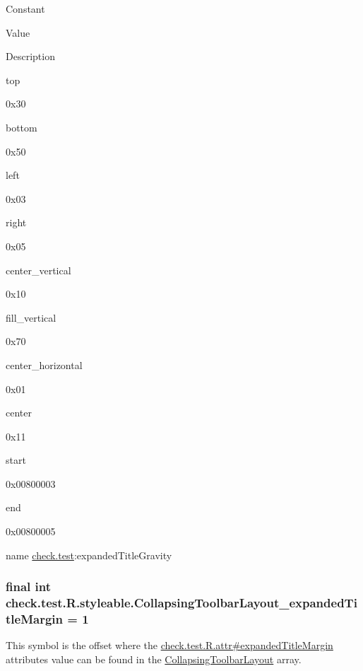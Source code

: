 Constant

Value

Description 

{\ttfamily top}

0x30

{\ttfamily bottom}

0x50

{\ttfamily left}

0x03

{\ttfamily right}

0x05

{\ttfamily center\+\_\+vertical}

0x10

{\ttfamily fill\+\_\+vertical}

0x70

{\ttfamily center\+\_\+horizontal}

0x01

{\ttfamily center}

0x11

{\ttfamily start}

0x00800003

{\ttfamily end}

0x00800005

name \hyperlink{namespacecheck_1_1test}{check.\+test}\+:expanded\+Title\+Gravity \hypertarget{classcheck_1_1test_1_1_r_1_1styleable_ab6768f81043a9099ccaa6b71b1e063b7}{}
\subsubsection[{Collapsing\+Toolbar\+Layout\+\_\+expanded\+Title\+Margin}]{\setlength{\rightskip}{0pt plus 5cm}final int check.\+test.\+R.\+styleable.\+Collapsing\+Toolbar\+Layout\+\_\+expanded\+Title\+Margin = 1\hspace{0.3cm}{\ttfamily [static]}}\label{classcheck_1_1test_1_1_r_1_1styleable_ab6768f81043a9099ccaa6b71b1e063b7}
This symbol is the offset where the \hyperlink{classcheck_1_1test_1_1_r_1_1attr_ae7ba337e417e42b557bf230f1801e60c}{check.\+test.\+R.\+attr\#expanded\+Title\+Margin} attribute\textquotesingle{}s value can be found in the \hyperlink{classcheck_1_1test_1_1_r_1_1styleable_a0c512120c75d0ddac20063034a72db17}{Collapsing\+Toolbar\+Layout} array.

